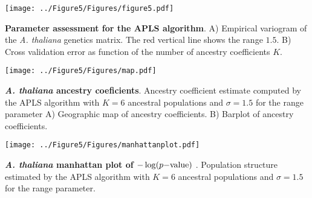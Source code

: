 \clearpage 
\newpage

\begin{center}
\texttt{[image: ../Figure5/Figures/figure5.pdf]}
\end{center}
 {\bf Parameter assessment for the APLS algorithm}. A) Empirical variogram of the {\it A. thaliana} genetics matrix. The red vertical line shows the range $1.5$. B) Cross validation error as function of the number of ancestry coefficients $K$.

\clearpage 
\newpage

\begin{center}
\texttt{[image: ../Figure5/Figures/map.pdf]}
\end{center}
 {\bf {\it A. thaliana} ancestry coeficients}. Ancestry coefficient estimate computed by the APLS algorithm with $K=6$ ancestral populations and $\sigma = 1.5$ for the range parameter A) Geographic map of ancestry coefficients. B) Barplot of ancestry coefficients.

\clearpage 
\newpage

\begin{center}
\texttt{[image: ../Figure5/Figures/manhattanplot.pdf]}
\end{center}
 {\bf {\it A.  thaliana} manhattan plot of $-\log(p{\rm -value})$ }. Population structure estimated by the APLS algorithm with $K=6$ ancestral populations and $\sigma = 1.5$ for the range parameter.




